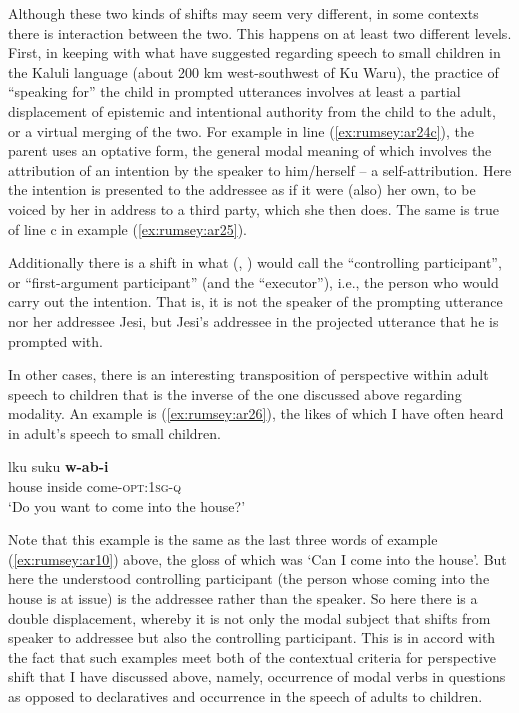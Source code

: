 \documentclass[output=paper]{langsci/langscibook}
\begin{document}
Although these two kinds of shifts may seem very different, in some contexts there is interaction between the two. This happens on at least two different levels. First, in keeping with what \cite[451]{SanRoqueSchieffelin2018} have suggested regarding speech to small children in the Kaluli language (about 200 km west-southwest of Ku Waru), the practice of  “speaking for” the child in prompted utterances involves at least a partial displacement of epistemic and intentional authority from the child to the adult, or a virtual merging of the two. For example in line (\ref{ex:rumsey:ar24c}), the parent uses an optative form, the general modal meaning of which involves the attribution of an intention by the speaker to him/herself – a self-attribution. Here the intention is presented to the addressee as if it were (also) her own, to be voiced by her in address to a third party, which she then does. The same is true of line c in example (\ref{ex:rumsey:ar25}).  

Additionally there is a shift in what \citeauthor{Nuyts2005} (\citeyear{Nuyts2005}, \citeyear{Nuyts2006}) would call the “controlling participant”, or “first-argument participant” (and \citealt{Lehmann2012} the “executor”), i.e., the person who would carry out the intention. That is, it is not the speaker of the prompting utterance nor her addressee Jesi, but Jesi’s addressee in the projected utterance that he is prompted with.

In other cases, there is an interesting transposition of perspective within adult speech to children that is the inverse of the one discussed above regarding modality. An example is (\ref{ex:rumsey:ar26}), the likes of which I have often heard in adult’s speech to small children.

\begin{exe}
	\ex \label{ex:rumsey:ar26}
	\gll lku suku \textbf{w-ab-i}\\
	house inside come-\textsc{opt:1sg-q}\\
	\trans ‘Do you want to come into the house?’
\end{exe}

Note that this example is the same as the last three words of example (\ref{ex:rumsey:ar10}) above, the gloss of which was ‘Can I come into the house’.  But here the understood controlling participant (the person whose coming into the house is at issue) is the addressee rather than the speaker. So here there is a double displacement, whereby it is not only the modal subject that shifts from speaker to addressee but also the controlling participant. This is in accord with the fact that such examples meet both of the contextual criteria for perspective shift that I have discussed above, namely, occurrence of modal verbs in questions as opposed to declaratives and occurrence in the speech of adults to children.
\end{document}

